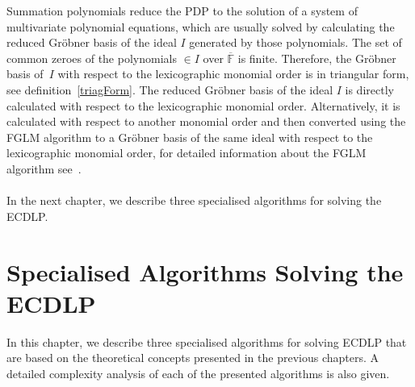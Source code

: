 \documentclass[thesis=M,english]{FITthesis}[2012/10/20]
\theoremstyle{remark}
\theoremstyle{definition}
\begin{document}
\noindent Summation polynomials reduce the PDP to the solution of a system of multivariate polynomial equations, which are usually solved by calculating the reduced Gröbner basis of the ideal $I$ generated by those polynomials. The set of common zeroes of the polynomials $\in I$ over $\overline{\mathbb{F}}$ is finite. Therefore, the Gröbner basis of~$I$ with respect to the lexicographic monomial order is in triangular form, see definition~\ref{triagForm}. The reduced Gröbner basis of the ideal $I$ is directly calculated with respect to the lexicographic monomial order. Alternatively, it is calculated with respect to another monomial order and then converted using the FGLM algorithm to a Gröbner basis of the same ideal with respect to the lexicographic monomial order, for detailed information about the FGLM algorithm see~\cite{FGLM}. \\ \\
\noindent In the next chapter, we describe three specialised algorithms for solving the ECDLP. 
\chapter{Specialised Algorithms Solving the ECDLP}
\label{specAlg}
In this chapter, we describe three specialised algorithms for solving ECDLP that are based on the theoretical concepts presented in the previous chapters. A detailed complexity analysis of each of the presented algorithms is also given.
\end{document}
